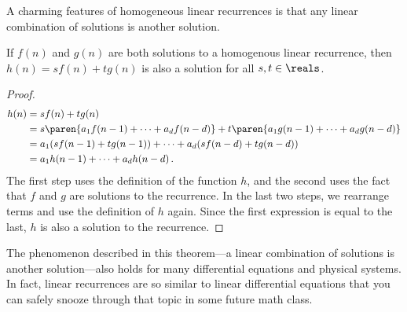 A charming features of homogeneous linear recurrences is that any
linear combination of solutions is another solution.

\begin{theorem}
\label{th:recur-linearity}
  If $f(n)$ and $g(n)$ are both solutions to a homogenous linear
  recurrence, then $h(n) = s f(n) + t g(n)$ is also a solution for all
  $s, t \in \reals$.
\end{theorem}
\begin{proof}
\begin{align*}
h(n) & = sf(n) + tg(n) \\
& = s \paren{a_1 f(n-1) + \cdots + a_d f(n - d)} +
    t \paren{a_1 g(n-1) + \cdots + a_d g(n - d)} \\
& = a_1 (s f(n-1) + t g(n-1)) + \cdots + a_d (s f(n-d) + t g(n-d)) \\
& = a_1 h(n-1) + \cdots + a_d h(n-d)\, .
\end{align*}
The first step uses the definition of the function $h$, and the second
uses the fact that $f$ and $g$ are solutions to the recurrence.  In
the last two steps, we rearrange terms and use the definition of $h$
again.  Since the first expression is equal to the last, $h$ is also a
solution to the recurrence.
\end{proof}

The phenomenon described in this theorem---a linear combination of
solutions is another solution---also holds for many differential
equations and physical systems.  In fact, linear recurrences are so
similar to linear differential equations that you can safely snooze
through that topic in some future math class.

